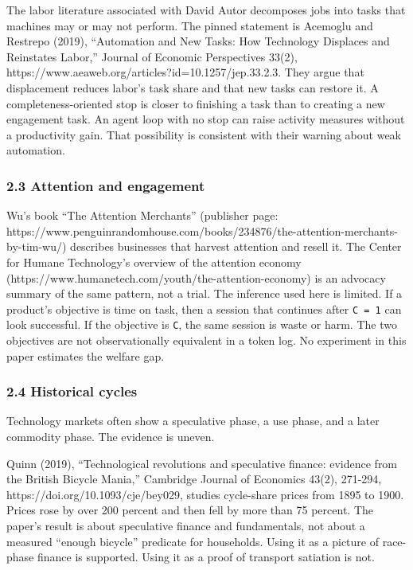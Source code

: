 \documentclass[
  10pt,
]{article}
\begin{document}
The labor literature associated with David Autor decomposes jobs into
tasks that machines may or may not perform. The pinned statement is
Acemoglu and Restrepo (2019), ``Automation and New Tasks: How Technology
Displaces and Reinstates Labor,'' Journal of Economic Perspectives
33(2), https://www.aeaweb.org/articles?id=10.1257/jep.33.2.3. They argue
that displacement reduces labor's task share and that new tasks can
restore it. A completeness-oriented stop is closer to finishing a task
than to creating a new engagement task. An agent loop with no stop can
raise activity measures without a productivity gain. That possibility is
consistent with their warning about weak automation.

\subsubsection{2.3 Attention and
engagement}\label{attention-and-engagement}

Wu's book ``The Attention Merchants'' (publisher page:
https://www.penguinrandomhouse.com/books/234876/the-attention-merchants-by-tim-wu/)
describes businesses that harvest attention and resell it. The Center
for Humane Technology's overview of the attention economy
(https://www.humanetech.com/youth/the-attention-economy) is an advocacy
summary of the same pattern, not a trial. The inference used here is
limited. If a product's objective is time on task, then a session that
continues after \texttt{C\ =\ 1} can look successful. If the objective
is \texttt{C}, the same session is waste or harm. The two objectives are
not observationally equivalent in a token log. No experiment in this
paper estimates the welfare gap.

\subsubsection{2.4 Historical cycles}\label{historical-cycles}

Technology markets often show a speculative phase, a use phase, and a
later commodity phase. The evidence is uneven.

Quinn (2019), ``Technological revolutions and speculative finance:
evidence from the British Bicycle Mania,'' Cambridge Journal of
Economics 43(2), 271-294, https://doi.org/10.1093/cje/bey029, studies
cycle-share prices from 1895 to 1900. Prices rose by over 200 percent
and then fell by more than 75 percent. The paper's result is about
speculative finance and fundamentals, not about a measured ``enough
bicycle'' predicate for households. Using it as a picture of race-phase
finance is supported. Using it as a proof of transport satiation is not.
\end{document}
